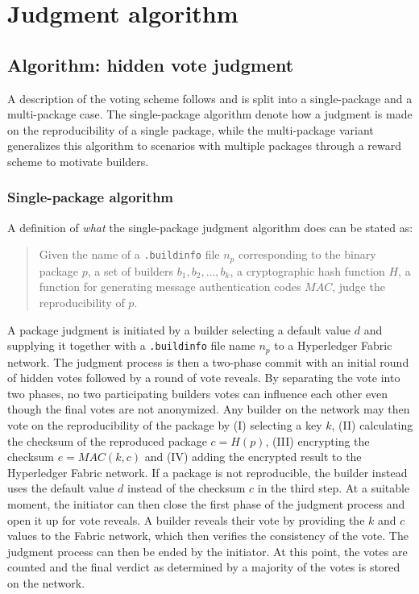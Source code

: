 \chapter{Judgment algorithm}

\section{Algorithm: hidden vote judgment}

A description of the voting scheme follows and is split into a single-package and a multi-package case. The single-package algorithm denote how a judgment is made on the reproducibility of a single package, while the multi-package variant generalizes this algorithm to scenarios with multiple packages through a reward scheme to motivate builders.

\subsection{Single-package algorithm}
\label{subsec:AlgorithmSingle}

A definition of \textit{what} the single-package judgment algorithm does can be stated as:

\begin{quote}
	Given the name of a \texttt{.buildinfo} file $n_p$ corresponding to the binary package $p$, a set of builders $b_1, b_2, \dotsc, b_k$, a cryptographic hash function $H$, a function for generating message authentication codes $MAC$, judge the reproducibility of $p$.
\end{quote}


A package judgment is initiated by a builder selecting a default value $d$ and supplying it together with a \texttt{.buildinfo} file name $n_p$ to a Hyperledger Fabric network. The judgment process is then a two-phase commit with an initial round of hidden votes followed by a round of vote reveals. By separating the vote into two phases, no two participating builders votes can influence each other even though the final votes are not anonymized. Any builder on the network may then vote on the reproducibility of the package by (I) selecting a key $k$, (II) calculating the checksum of the reproduced package $c = H(p)$, (III) encrypting the checksum $e = MAC(k, c)$ and (IV) adding the encrypted result to the Hyperledger Fabric network. If a package is not reproducible, the builder instead uses the default value $d$ instead of the checksum $c$ in the third step. At a suitable moment, the initiator can then close the first phase of the judgment process and open it up for vote reveals. A builder reveals their vote by providing the $k$ and $c$ values to the Fabric network, which then verifies the consistency of the vote. The judgment process can then be ended by the initiator. At this point, the votes are counted and the final verdict as determined by a majority of the votes is stored on the network.


